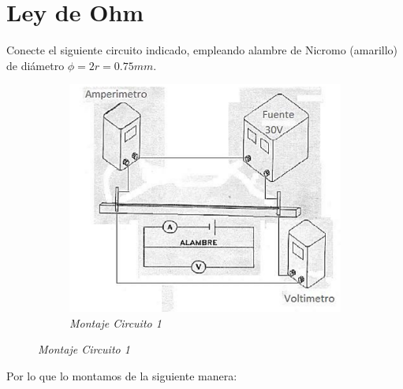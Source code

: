 \section{Ley de Ohm}

Conecte el siguiente circuito indicado, empleando alambre de Nicromo
(amarillo) de diámetro $\phi = 2r = 0.75mm$.

\begin{figure}[H]
    \centering
    \begin{subfigure}[b]{0.5\textwidth}
        \centering
        \includegraphics[width=\textwidth]{Figures/0. General/figure_1_1.png}
        \caption{\textit{Montaje Circuito 1}}
        \label{fig: Montaje Circuito 1}
    \end{subfigure}
\end{figure}


Por lo que lo montamos de la siguiente manera:

